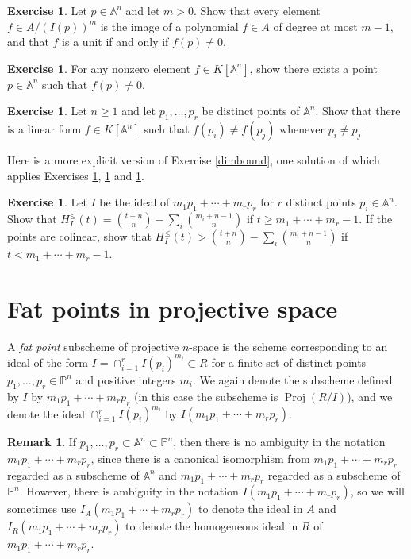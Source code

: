 \documentclass[11pt,twoside]{amsart}
\numberwithin{equation}{section}
\newcounter{xrcs}[section]
\theoremstyle{definition}
\newtheorem{exercise}[xrcs]{Exercise}
\newtheorem{remark}[theorem]{Remark}
\begin{document}
\begin{exercise}\label{units}
Let $p\in{\mathbb{A}^{{n}}}$ and let $m>0$. Show that every element $\overline{f}\in A/(I(p))^m$ is the image of
a polynomial $f\in A$ of degree at most $m-1$, and that $\overline{f}$ is a unit if and only if $f(p)\neq0$.
\end{exercise}

\begin{exercise}\label{AffIsIrr}
For any nonzero element $f\in{K}[{\mathbb{A}^{{n}}}]$, show there exists a point $p\in{\mathbb{A}^{{n}}}$ such that
$f(p)\neq0$.
\end{exercise}

\begin{exercise}\label{pointsavoidance}
Let $n\geq 1$ and let $p_1,\ldots,p_r$ be distinct points of ${\mathbb{A}^{{n}}}$. Show that there is 
a linear form $f\in{K}[{\mathbb{A}^{{n}}}]$ such that $f(p_i)\neq f(p_j)$ whenever $p_i\neq p_j$.
\end{exercise}

Here is a more explicit version of Exercise \ref{dimbound}, one solution
of which applies Exercises \ref{units}, \ref{AffIsIrr} and \ref{pointsavoidance}. 

\begin{exercise}\label{dimbound2}
Let $I$ be the ideal of $m_1p_1+\cdots+m_rp_r$ for $r$ distinct points $p_i\in{\mathbb{A}^{{n}}}$. 
Show that $H^\leq_{I}(t)=\binom{t+n}{n}-\sum_i\binom{m_i+n-1}{n}$ if $t\geq m_1+\cdots+m_r-1$.
If the points are colinear, show that 
$H^\leq_{I}(t)>\binom{t+n}{n}-\sum_i\binom{m_i+n-1}{n}$ if $t<m_1+\cdots+m_r-1$.
\end{exercise}

\section{Fat points in projective space}

A \emph{fat point} subscheme of projective $n$-space is the scheme corresponding to an ideal of the form
$I=\cap_{i=1}^rI(p_i)^{m_i}\subset R$ for a finite set of distinct points $p_1,\ldots,p_r\in{\mathbb{P}^{{n}}}$
and positive integers $m_i$. We again denote the subscheme defined by $I$ by
$m_1p_1+\cdots+m_rp_r$ (in this case the subscheme is ${\operatorname{Proj}}(R/I)$), and 
we denote the ideal $\cap_{i=1}^rI(p_i)^{m_i}$ by $I(m_1p_1+\cdots+m_rp_r)$.

\begin{remark}
If $p_1,\ldots,p_r\subset {\mathbb{A}^{{n}}}\subset{\mathbb{P}^{{n}}}$, then there is no ambiguity in the notation
$m_1p_1+\cdots+m_rp_r$, since there is a canonical isomorphism
from $m_1p_1+\cdots+m_rp_r$ regarded as a subscheme of ${\mathbb{A}^{{n}}}$ and
$m_1p_1+\cdots+m_rp_r$ regarded as a subscheme of ${\mathbb{P}^{{n}}}$.
However, there is ambiguity in the notation $I(m_1p_1+\cdots+m_rp_r)$,
so we will sometimes use $I_A(m_1p_1+\cdots+m_rp_r)$ to denote the ideal in $A$
and $I_R(m_1p_1+\cdots+m_rp_r)$ to denote the homogeneous ideal in $R$
of $m_1p_1+\cdots+m_rp_r$. 
\end{remark}
\end{document}
